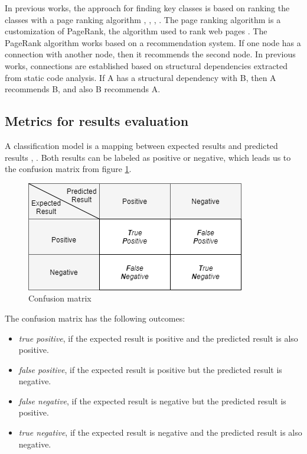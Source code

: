 \documentclass[12pt]{mitthesis}
\begin{document}
In previous works, the approach for finding key classes is based on ranking the classes with a page ranking algorithm \cite{PagerankENASE}, \cite{enase15}, \cite{Finding-key-classes}, \cite{PagerankSACI} . The page ranking algorithm is a customization of PageRank, the algorithm used to rank web pages \cite{ilprints422}. 
The PageRank algorithm works based on a recommendation system. If one node has a connection with another node, then it recommends the second node. In previous works, connections are established based on structural dependencies extracted from static code analysis. If A has a structural dependency with B, then A recommends B, and also B recommends A. 

\subsection{Metrics for results evaluation}
\label{sec:evalmetrics}
A classification model is a mapping between expected results and predicted results \cite{ROCIntro}, \cite{ROCBRADLEY19971145}. Both results can be labeled as positive or negative, which leads us to the confusion matrix from figure \ref{fig:confusion}. 
\begin{figure}[h]
\centering
\includegraphics[scale=0.9]{confusion.png}
\caption{Confusion matrix}
\label{fig:confusion}
\centering
\end{figure}
The confusion matrix has the following outcomes:
		\begin{itemize}
			\item \textit{true positive}, if the expected result is positive and the predicted result is also positive.
			\item \textit{false positive}, if the expected result is positive but the predicted result is negative.
			\item \textit{false negative}, if the expected result is negative but the predicted result is positive.
			\item \textit{true negative}, if the expected result is negative and the predicted result is also negative.
		\end{itemize}
\end{document}
